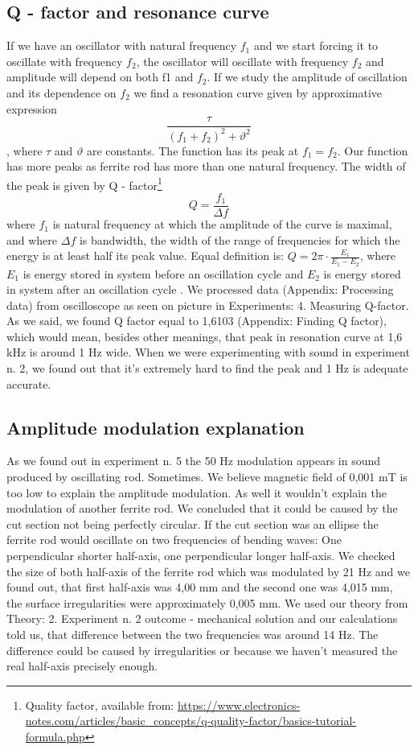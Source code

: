 \documentclass[10pt,a4paper]{article}
\begin{document}
\subsection{Q - factor and resonance curve}
If we have an oscillator with natural frequency $f_{1}$ and we start forcing it to oscillate with frequency $f_{2}$, the oscillator will oscillate with frequency $f_{2}$ and amplitude will depend on both f1 and $f_{2}$. If we study the amplitude of oscillation and its dependence on $f_{2}$ we find a resonation curve given by approximative expression $$ \frac{\tau}{(f_{1} + f_{2})^{2}+\vartheta^{2}} $$, where $\tau$ and $\vartheta$ are constants. The function has its peak at $f_{1} = f_{2}$. Our function has more peaks as ferrite rod has more than one natural frequency. The width of the peak is given by Q - factor\footnote{\label{Q}Quality factor, available from: \url{https://www.electronics-notes.com/articles/basic_concepts/q-quality-factor/basics-tutorial-formula.php}}
$$Q = \frac{f_{1}}{\Delta f}$$
where $f_{1}$ is natural frequency at which the amplitude of the curve is maximal, and where $\Delta f$ is bandwidth, the width of the range of frequencies for which the energy is at least half its peak value. Equal definition is: $Q=2\pi \cdot \frac{E_{1}}{E_{1} - E_{2}}$, where $E_{1}$ is energy stored in system before an oscillation cycle and $E_{2}$ is energy stored in system after an oscillation cycle . We processed data (Appendix: Processing data) from oscilloscope as seen on picture in Experiments: 4. Measuring Q-factor. As we said, we found Q factor equal to 1,6103 (Appendix: Finding Q factor), which would mean, besides other meanings, that peak in resonation curve at 1,6 kHz is around 1 Hz wide. When we were experimenting with sound in experiment n. 2, we found out that it's extremely hard to find the peak and 1 Hz is adequate accurate.
\subsection{Amplitude modulation explanation}
As we found out in experiment n. 5 the 50 Hz modulation appears in sound produced by oscillating rod. Sometimes. We believe magnetic field of 0,001 mT is too low to explain the amplitude modulation. As well it wouldn’t explain the modulation of another ferrite rod. We concluded that it could be caused by the cut section not being perfectly circular. If the cut section was an ellipse the ferrite rod would oscillate on two frequencies of bending waves: One perpendicular shorter half-axis, one perpendicular longer half-axis. We checked the size of both half-axis of the ferrite rod which was modulated by 21 Hz and we found out, that first half-axis was 4,00 mm and the second one was 4,015 mm, the surface irregularities were approximately 0,005 mm. We used our theory from Theory: 2. Experiment n. 2 outcome - mechanical solution and our calculations told us, that difference between the two frequencies was around 14 Hz. The difference could be caused by irregularities or because we haven't measured the real half-axis precisely enough.
\end{document}
